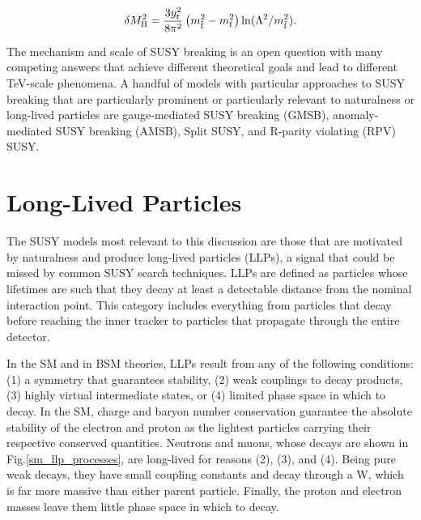 \documentclass[12pt]{article}
\begin{document}
    \noindent \begin{equation}
        \delta M_{\mathrm{H}}^2 = \frac{3y_t^2}{8\pi^2}\left(m_{\tilde{\mathrm{f}}}^2 - m_{\mathrm{f}}^2 \right)\ln(\Lambda^2/m_{\tilde{\mathrm{f}}}^2).
    \label{higgs_susy_correction}
    \end{equation}
    
    The mechanism and scale of SUSY breaking is an open question with many competing answers that achieve different theoretical goals and lead to different TeV-scale phenomena. A handful of models with particular approaches to SUSY breaking that are particularly prominent or particularly relevant to naturalness or long-lived particles are gauge-mediated SUSY breaking (GMSB), anomaly-mediated SUSY breaking (AMSB), Split SUSY, and R-parity violating (RPV) SUSY.

\section{Long-Lived Particles}
    The SUSY models most relevant to this discussion are those that are motivated by naturalness and produce long-lived particles (LLPs), a signal that could be missed by common SUSY search techniques. LLPs are defined as particles whose lifetimes are such that they decay at least a detectable distance from the nominal interaction point. This category includes everything from particles that decay before reaching the inner tracker to particles that propagate through the entire detector. 

    In the SM and in BSM theories, LLPs result from any of the following conditions: (1) a symmetry that guarantees stability, (2) weak couplings to decay products, (3) highly virtual intermediate states, or (4) limited phase space in which to decay. In the SM, charge and baryon number conservation guarantee the absolute stability of the electron and proton as the lightest particles carrying their respective conserved quantities. Neutrons and muons, whose decays are shown in Fig.\ref{sm_llp_processes}, are long-lived for reasons (2), (3), and (4). Being pure weak decays, they have small coupling constants and decay through a W, which is far more massive than either parent particle. Finally, the proton and electron masses leave them little phase space in which to decay.
\end{document}
